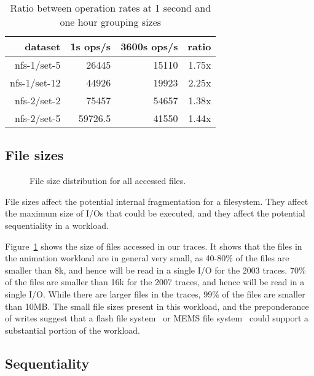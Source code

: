 \begin{table}
\begin{tabular}{|r|r|r|r|}
\hline
dataset & 1s ops/s & 3600s ops/s & ratio \\
\hline
nfs-1/set-5  & 26445  & 15110 & 1.75x \\
nfs-1/set-12 & 44926 & 19923 & 2.25x \\
nfs-2/set-2  & 75457 & 54657 & 1.38x \\
nfs-2/set-5  & 59726.5 & 41550 & 1.44x \\
\hline
\end{tabular}
\caption{Ratio between operation rates at 1 second and one hour grouping sizes}
\label{table:99quant-differences}
\end{table}

\subsection{File sizes}

\begin{figure}
\caption{File size distribution for all accessed files.}
\label{fig:file-size}
\end{figure}

File sizes affect the potential internal fragmentation for a
filesystem.  They affect the maximum size of I/Os that could be
executed, and they affect the potential sequentiality in a workload.

Figure~\ref{fig:file-size} shows the size of files accessed in our
traces.  It shows that the files in the animation workload are in
general very small, as 40-80\% of the files are smaller than 8k, and
hence will be read in a single I/O for the 2003 traces.  70\% of the
files are smaller than 16k for the 2007 traces, and hence will be read
in a single I/O.  While there are larger files in the traces, 99\% of
the files are smaller than 10MB.  The small file sizes present in this
workload, and the preponderance of writes suggest that a flash file
system~\cite{Kawaguchi95aflash-memory} or MEMS file
system~\cite{SchlosserFast04} could support a substantial portion of
the workload.

\subsection{Sequentiality}

